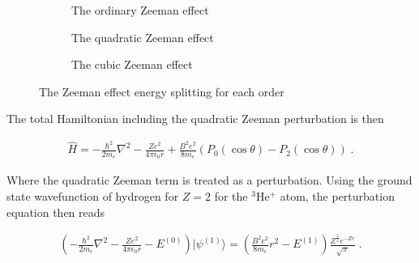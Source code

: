 

        \begin{figure}[h]
            \centering
            \begin{subfigure}{0.28\linewidth}
                \resizebox{\textwidth}{!}{}
                \caption{The ordinary Zeeman effect}
                \label{fig:a}
            \end{subfigure}
            \hfill
            \begin{subfigure}{0.32\linewidth}
                \resizebox{0.9\textwidth}{!}{}
                \caption{The quadratic Zeeman effect}
                \label{fig:b}
            \end{subfigure}
            \hfill
            \begin{subfigure}{0.28\linewidth}
                \resizebox{\textwidth}{!}{}
                \caption{The cubic Zeeman effect}
                \label{fig:c}
            \end{subfigure}
            \caption{The Zeeman effect energy splitting for each order}
            \label{fig:overall}
        \end{figure}

        \noindent The total Hamiltonian including the quadratic Zeeman perturbation is then 

        \begin{align}
            \hat{H} = - \frac{\hbar^2}{2m_e} \nabla^2 - \frac{Ze^2}{4\pi \epsilon_0 r} + \frac{B^2e^2}{8m_e} (P_0(\cos \theta) - P_2(\cos \theta))\;. \label{eq:r_sqrd_perturbation}
        \end{align}

        \noindent Where the quadratic Zeeman term is treated as a perturbation. Using the ground state wavefunction of hydrogen for $Z = 2$ for the $^3$He$^+$ atom, the perturbation equation then reads 

        \begin{align}
            \left(- \frac{\hbar^2}{2m_e} \nabla^2 - \frac{Ze^2}{4\pi \epsilon_0 r} - E^{(0)} \right) \vert \psi^{(1)} \rangle = \left(\frac{B^2e^2}{8m_e}r^2 - E^{(1)} \right) \frac{Z^\frac{3}{2} e^{-Zr}}{\sqrt{\pi}}\;.
        \end{align}

